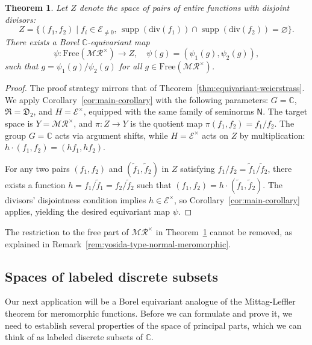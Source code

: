 \documentclass[12pt]{paper}
\numberwithin{equation}{section}
\theoremstyle{plain}
\newtheorem{theorem}{Theorem}[section]
\theoremstyle{definition}
\newcommand{\C}{\mathbb{C}}
\newcommand{\mfD}{\mathfrak{D}}
\newcommand{\mfR}{\mathfrak{R}}
\newcommand{\merom}[1][]{\mathcal{MR}_{#1}}
\newcommand{\meromnz}{\merom^{\times}}
\newcommand{\holomnz}[1][]{\mathcal{E}^{\times}_{#1}}
\newcommand{\holom}[1][]{\mathcal{E}_{#1}}
\newcommand{\dm}{\mathrm{div}}      %
\newcommand{\unifn}{\mathsf{N}}
\renewcommand{\tilde}{\widetilde}
\DeclareMathOperator*{\supp}{\mathrm{supp}}
\newcommand{\free}{\mathrm{Free}}
\begin{document}
\begin{theorem}
  \label{thm:merormophic-quotient-entire}
  Let \(Z\) denote the space of pairs of entire functions with disjoint divisors:
  \[ Z = \{(f_{1},f_{2}) \mid f_{i} \in \holom[\ne 0],\, \supp(\dm(f_{1})) \cap \supp(\dm(f_{2})) =
    \varnothing \}. \] There exists a Borel \(\C\)-equivariant map
  \[ \psi : \free(\meromnz) \to Z, \quad \psi(g) = (\psi_{1}(g), \psi_{2}(g)), \]
  such that \( g = \psi_{1}(g)/\psi_{2}(g) \) for all \( g \in \free(\meromnz) \).
\end{theorem}

\begin{proof}
  The proof strategy mirrors that of Theorem~\ref{thm:equivariant-weierstrass}. We apply
  Corollary~\ref{cor:main-corollary} with the following parameters: \( G = \C \),
  \( \mfR = \mfD_{2} \), and \( H = \holomnz \), equipped with the same family of seminorms
  \( \unifn \). The target space is \( Y = \meromnz \), and \( \pi : Z \to Y \) is the quotient map
  \( \pi(f_{1},f_{2}) = f_{1}/f_{2} \). The group \( G = \C \) acts via argument shifts, while
  \( H = \holomnz \) acts on \( Z \) by multiplication:
  \( h \cdot (f_{1}, f_{2}) = (hf_{1}, hf_{2}) \).

  For any two pairs \((f_{1}, f_{2})\) and \((\tilde{f}_{1}, \tilde{f}_{2})\) in \(Z\) satisfying
  \(f_{1}/f_{2} = \tilde{f}_{1}/\tilde{f}_{2}\), there exists a function
  \(h = f_{1}/\tilde{f}_{1} = f_{2}/\tilde{f}_{2}\) such that
  \( (f_{1}, f_{2}) = h \cdot (\tilde{f}_{1}, \tilde{f}_{2})\). The divisors' disjointness condition
  implies \(h \in \holomnz\), so Corollary~\ref{cor:main-corollary} applies, yielding the desired
  equivariant map \(\psi\).
\end{proof}

The restriction to the free part of \(\meromnz\) in Theorem~\ref{thm:merormophic-quotient-entire}
cannot be removed, as explained in Remark~\ref{rem:yosida-type-normal-meromorphic}.



\subsection{Spaces of labeled discrete subsets}
\label{sec:spaces_of_labeled_discrete_subsets}

Our next application will be a Borel equivariant analogue of the Mittag-Leffler theorem for
meromorphic functions.  Before we can formulate and prove it, we need to establish several
properties of the space of principal parts, which we can think of as labeled discrete subsets of
\(\C\).
\end{document}
